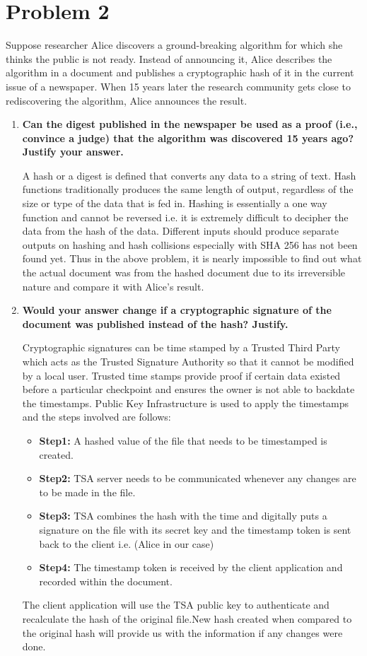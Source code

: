 \documentclass{article}
\begin{document}
\section{Problem 2}

Suppose researcher Alice discovers a ground-breaking algorithm for which she thinks the
public is not ready. Instead of announcing it, Alice describes the algorithm in a document and publishes a cryptographic hash of it in the current issue of a newspaper. When 15 years later the research community gets close to rediscovering the algorithm, Alice announces the result.
\begin{enumerate}[label=\alph*]
\item \textbf{Can the digest published in the newspaper be used as a proof (i.e., convince a judge) that the algorithm was discovered 15 years ago? Justify your answer.}

A hash or a digest is defined that converts any data to a string of text. Hash functions traditionally produces the same length of output, regardless of the size or type of the data that is fed in. Hashing is essentially a one way function and cannot be reversed i.e. it is extremely difficult to decipher the data from the hash of the data. Different inputs should produce separate outputs on hashing and hash collisions especially with SHA 256 has not been found yet. Thus in the above problem, it is nearly impossible to find out what the actual document was from the hashed document due to its irreversible nature and compare it with Alice's result.

\item \textbf{Would your answer change if a cryptographic signature of the document was published instead of the hash? Justify.}

Cryptographic signatures can be time stamped by a Trusted Third Party which acts as the Trusted Signature Authority so that it cannot be modified by a local user. Trusted time stamps provide proof if certain data existed before a particular checkpoint and ensures the owner is not able to backdate the timestamps. Public Key Infrastructure is used to apply the timestamps and the steps involved are follows:
\begin{itemize}
\item\textbf{Step1:} A hashed value of the file that needs to be timestamped is created.
\item\textbf{Step2:} TSA server needs to be communicated whenever any changes are to be made in the file.
\item\textbf{Step3:} TSA combines the hash with the time and digitally puts a signature on the file with its secret key and the timestamp token is sent back to the client i.e. (Alice in our case)
\item\textbf{Step4:} The timestamp token is received by the client application and recorded within the document.
\end{itemize}
The client application will use the TSA public key to authenticate and recalculate the hash of the original file.New hash created when compared to the original hash will provide us with the information if any changes were done.


\end{enumerate}
\end{document}
